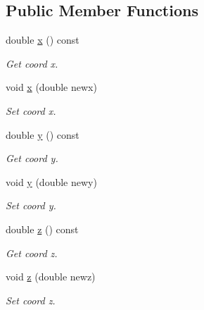 \subsection*{Public Member Functions}
\begin{DoxyCompactItemize}
\item 
\hypertarget{class_point3_d_ada3b28b2c868649ad4d68e9001b3d991}{double \hyperlink{class_point3_d_ada3b28b2c868649ad4d68e9001b3d991}{x} () const }\label{class_point3_d_ada3b28b2c868649ad4d68e9001b3d991}

\begin{DoxyCompactList}\small\item\em Get coord x. \end{DoxyCompactList}\item 
\hypertarget{class_point3_d_a8289fc2d572ccba7f605b9fbe7225b46}{void \hyperlink{class_point3_d_a8289fc2d572ccba7f605b9fbe7225b46}{x} (double newx)}\label{class_point3_d_a8289fc2d572ccba7f605b9fbe7225b46}

\begin{DoxyCompactList}\small\item\em Set coord x. \end{DoxyCompactList}\item 
\hypertarget{class_point3_d_afcabb8cbb3e5ef969f7e6117d4b85496}{double \hyperlink{class_point3_d_afcabb8cbb3e5ef969f7e6117d4b85496}{y} () const }\label{class_point3_d_afcabb8cbb3e5ef969f7e6117d4b85496}

\begin{DoxyCompactList}\small\item\em Get coord y. \end{DoxyCompactList}\item 
\hypertarget{class_point3_d_a3cbeb175d16bd3067569115f7e026fd3}{void \hyperlink{class_point3_d_a3cbeb175d16bd3067569115f7e026fd3}{y} (double newy)}\label{class_point3_d_a3cbeb175d16bd3067569115f7e026fd3}

\begin{DoxyCompactList}\small\item\em Set coord y. \end{DoxyCompactList}\item 
\hypertarget{class_point3_d_ab2c30268a9b50d54ed1ae8285bedd931}{double \hyperlink{class_point3_d_ab2c30268a9b50d54ed1ae8285bedd931}{z} () const }\label{class_point3_d_ab2c30268a9b50d54ed1ae8285bedd931}

\begin{DoxyCompactList}\small\item\em Get coord z. \end{DoxyCompactList}\item 
\hypertarget{class_point3_d_a98dac6c2cac54f7d34ae6f23e6bcaf93}{void \hyperlink{class_point3_d_a98dac6c2cac54f7d34ae6f23e6bcaf93}{z} (double newz)}\label{class_point3_d_a98dac6c2cac54f7d34ae6f23e6bcaf93}

\begin{DoxyCompactList}\small\item\em Set coord z. \end{DoxyCompactList}\end{DoxyCompactItemize}



